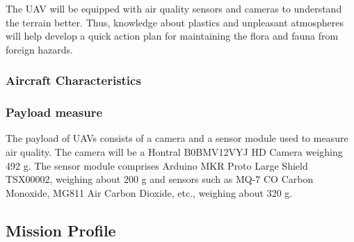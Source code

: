 \documentclass[12 pt]{article}
\begin{document}
The UAV will be equipped with air quality sensors and cameras to understand the terrain better. Thus, knowledge about plastics and unpleasant atmospheres will help develop a quick action plan for maintaining the flora and fauna from foreign hazards.

\subsubsection{Aircraft Characteristics}
\begin{table}[h]
\centering
{}
\end{table}

\subsubsection{Payload measure}
The payload of UAVs consists of a camera and a sensor module used to measure air quality. The camera will be a Hontral B0BMV12VYJ HD Camera weighing 492 g. The sensor module comprises Arduino MKR Proto Large Shield TSX00002, weighing about 200 g and sensors such as MQ-7 CO Carbon Monoxide, MG811 Air Carbon Dioxide, etc., weighing about 320 g.

\subsection{Mission Profile}
\end{document}
